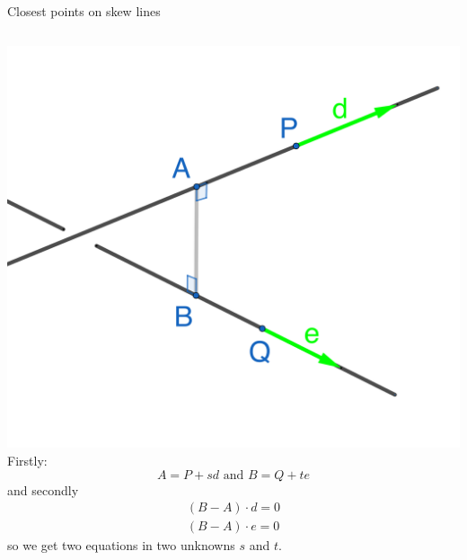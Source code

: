 \documentclass{beamer}
\begin{document}
\begin{frame}{Closest points on skew lines}
\begin{columns}
    \hspace{-1cm}
    \includegraphics[scale=0.3]{skwe-lines.png}
    \hspace{1cm}
    Firstly:
    \begin{equation*}
    A = P+sd\text{ and } B = Q+te
    \end{equation*}
    and secondly
    \begin{align*}
    (B-A)\cdot d = 0\\
    (B-A)\cdot e = 0
    \end{align*}
    so we get two equations in two unknowns $s$ and $t$.
\end{columns}
\end{frame}
\end{document}

